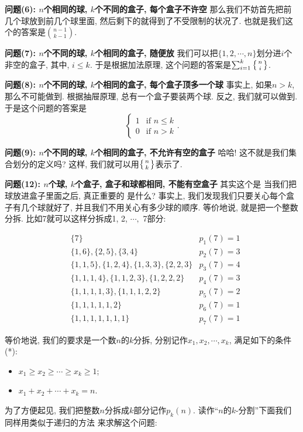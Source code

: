 \textbf{问题(6): $n$个相同的球, $k$个不同的盒子, 每个盒子不许空} 那么我们不妨首先把前几个球放到前几个球里面, 
然后剩下的就得到了不受限制的状况了. 也就是我们这个的答案是${n-1\choose k-1}. $

\textbf{问题(7): $n$个不同的球, $k$个相同的盒子, 随便放} 我们可以把$\{1,2,\cdots,n\}$划分进$i$个非空的盒子, 
其中, $i\leq k$. 于是根据加法原理, 这个问题的答案是$\sum_{i=1}^{k}\left\{{n \atop i}\right\}$. 

\textbf{问题(8): $n$个不同的球, $k$个相同的盒子, 每个盒子顶多一个球} 事实上, 如果$n>k$, 那么不可能做到.
根据抽屉原理, 总有一个盒子要装两个球. 反之, 我们就可以做到. 于是这个问题的答案是$$\begin{cases}1 & \text{if }n\leq k\\ 0& \text{if }n>k\end{cases}.$$

\textbf{问题(9): $n$个不同的球, $k$个相同的盒子, 不允许有空的盒子} 哈哈! 这不就是我们集合划分的定义吗? 
这样, 我们就可以用$\left\{{n \atop k}\right\}$表示了.

\textbf{问题(12): $n$个球, $k$个盒子, 盒子和球都相同, 不能有空盒子} 其实这个是
当我们把球放进盒子里面之后, 真正重要的
是什么? 事实上, 我们发现我们只要关心每个盒子有几个球就好了, 并且我们不用关心有多少球的顺序. 
等价地说, 就是把一个整数分拆. 比如7就可以这样分拆成1, 2, $\cdots,$ 7部分:

$$
\begin{aligned}
&\{7\}
& p_1(7)=1\\
&\{1,6\},\{2,5\},\{3,4\}
& p_2(7)=3\\
&\{1,1,5\}, \{1,2,4\}, \{1,3,3\}, \{2,2,3\} 
& p_3(7)=4\\
&\{1,1,1,4\},\{1,1,2,3\}, \{1,2,2,2\}
& p_4(7)=3\\
&\{1,1,1,1,3\},\{1,1,1,2,2\}
& p_5(7)=2\\
&\{1,1,1,1,1,2\}
& p_6(7)=1\\
&\{1,1,1,1,1,1,1\}
& p_7(7)=1
\end{aligned}
$$

等价地说, 我们的要求是一个数$n$的$k$分拆, 分别记作$x_1, x_2, \cdots, x_k$, 满足如下的条件(*): 
\begin{itemize}[noitemsep]
  \item  $x_1\ge x_2\ge\cdots\ge x_k\ge 1$;
  \item $x_1+x_2+\cdots+x_k=n$.
\end{itemize}

为了方便起见, 我们把整数$n$分拆成$k$部分记作$p_k(n)$. 读作``$n$的$k$-分割''下面我们同样用类似于递归的方法
来求解这个问题: 

